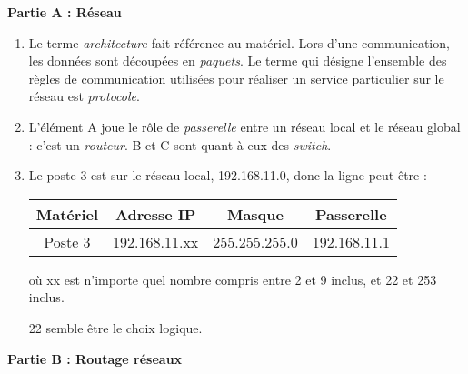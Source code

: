 \documentclass[a4paper,12pt,french]{article}
\begin{document}

\exo{}

\textbf{Partie A : Réseau}

\begin{enumerate}[\bfseries 1.]
\item 	Le terme \textit{architecture} fait référence au matériel. Lors d'une communication, les données sont découpées en \textit{paquets}.
Le terme qui désigne l'ensemble des règles de communication utilisées pour réaliser un service particulier sur le
réseau est \textit{protocole}.
\item 	L'élément A joue le rôle de \textit{passerelle} entre un réseau local et le réseau global : c'est un \textit{routeur}.
B et C sont quant à eux des \textit{switch}.
\item Le poste 3 est sur le réseau local, 192.168.11.0, donc la ligne peut être :
\begin{center}
\begin{tabular}{|c|c|c|c|}
\hline
\textbf{Matériel} &\textbf{Adresse IP}& \textbf{Masque}&\textbf{Passerelle}\\
\hline 

Poste 3  & 192.168.11.xx & 255.255.255.0 & 192.168.11.1 \\
\hline
\end{tabular}
\end{center}

où xx est n'importe quel nombre compris entre 2 et 9 inclus, et 22 et 253 inclus.

22 semble être le choix logique.\\ 

\end{enumerate}

\textbf{Partie B : Routage réseaux}
\end{document}

